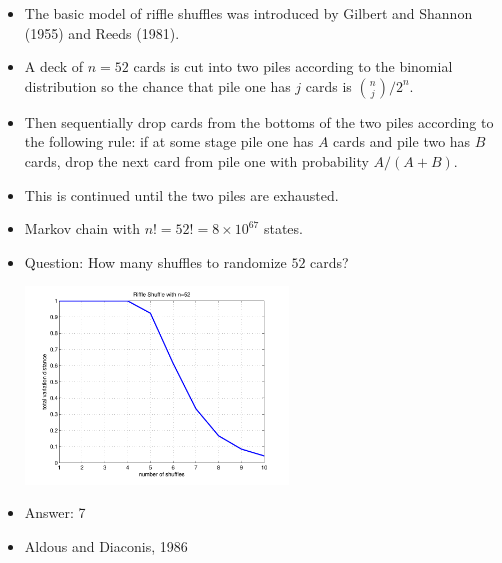\documentclass[12pt,t]{beamer}
\begin{document}
\begin{frame}
  \begin{itemize}
  \item The basic model of riffle shuffles was introduced by Gilbert
    and Shannon (1955) and Reeds (1981).
    \item A deck of $n = 52$ cards is cut into two piles according to
      the binomial distribution so the chance that pile one has $j$
      cards is ${n \choose j}/2^n$.
    \item Then sequentially drop cards from the bottoms of the two piles
      according to the following rule: if at some stage pile one has $A$
      cards and pile two has $B$ cards, drop the next card from pile one
      with probability $A/(A+B)$.
    \item This is continued until the two piles are exhausted.
    \item Markov chain with $n! = 52! = 8 \times 10^{67}$ states.
  \end{itemize}
\end{frame}
\begin{frame}
  \begin{itemize}
  \item Question: How many shuffles to randomize $52$ cards?
    \begin{center}
      \includegraphics[width=0.55\textwidth,trim=1cm 1cm 0cm 0cm]{riffleshuffle}
    \end{center}
  \item Answer: 7
  \item Aldous and Diaconis, 1986
  \end{itemize}
\end{frame}
\end{document}
